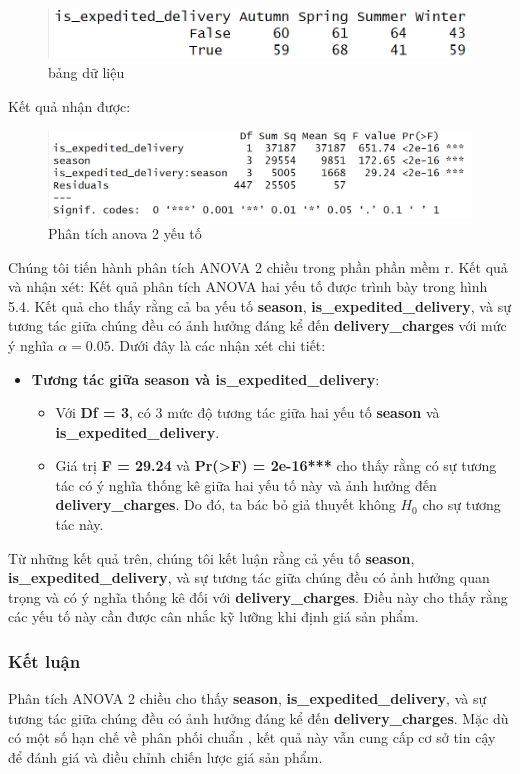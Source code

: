         \begin{figure}[!htbp]
            \centering
            \includegraphics[width=1\linewidth]{graphics/5.4.3.png}
            \caption{bảng dữ liệu}
        \end{figure}
        Kết quả nhận được: 

        \begin{figure}[!htbp]
            \centering
            \includegraphics[width=1\linewidth]{graphics/5.4.4.png}
            \caption{Phân tích anova 2 yếu tố}
        \end{figure}

        Chúng tôi tiến hành phân tích ANOVA 2 chiều trong phần phần mềm r. 
        Kết quả và nhận xét: 
        Kết quả phân tích ANOVA hai yếu tố được trình bày trong hình 5.4. Kết quả cho thấy rằng cả ba yếu tố \textbf{season}, \textbf{is\_expedited\_delivery}, và sự tương tác giữa chúng đều có ảnh hưởng đáng kể đến \textbf{delivery\_charges} với mức ý nghĩa $\alpha = 0.05$. Dưới đây là các nhận xét chi tiết:

        \begin{itemize}
    \item \textbf{Tương tác giữa season và is\_expedited\_delivery}:
    \begin{itemize}
        \item Với \textbf{Df = 3}, có 3 mức độ tương tác giữa hai yếu tố \textbf{season} và \textbf{is\_expedited\_delivery}.
        \item Giá trị \textbf{F = 29.24} và \textbf{Pr(>F) = 2e-16***} cho thấy rằng có sự tương tác có ý nghĩa thống kê giữa hai yếu tố này và ảnh hưởng đến \textbf{delivery\_charges}. Do đó, ta bác bỏ giả thuyết không \(H_0\) cho sự tương tác này.
    \end{itemize}

    \end{itemize}

 Từ những kết quả trên, chúng tôi kết luận rằng cả yếu tố \textbf{season}, \textbf{is\_expedited\_delivery}, và sự tương tác giữa chúng đều có ảnh hưởng quan trọng và có ý nghĩa thống kê đối với \textbf{delivery\_charges}. Điều này cho thấy rằng các yếu tố này cần được cân nhắc kỹ lưỡng khi định giá sản phẩm.
               
        
\subsubsection{Kết luận}
Phân tích ANOVA 2 chiều cho thấy \textbf{season}, \textbf{is\_expedited\_delivery}, và sự tương tác giữa chúng đều có ảnh hưởng đáng kể đến \textbf{delivery\_charges}. Mặc dù có một số hạn chế về phân phối chuẩn , kết quả này vẫn cung cấp cơ sở tin cậy để đánh giá và điều chỉnh chiến lược giá sản phẩm.